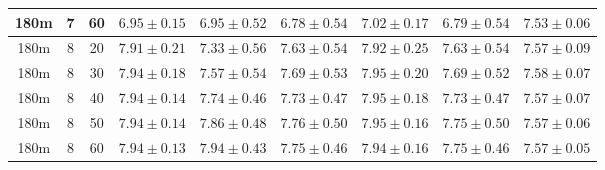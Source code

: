 \begin{table}
\begin{center}
\begin{tabular}{ccc|c|ccccc}
  180m &   7 &  60 & $6.95 \pm 0.15$ & $6.95 \pm 0.52$ & $6.78 \pm 0.54$ & $7.02 \pm 0.17$ & $6.79 \pm 0.54$ & $7.53 \pm 0.06$ \\ 
   \hline
180m &   8 &  20 & $7.91 \pm 0.21$ & $7.33 \pm 0.56$ & $7.63 \pm 0.54$ & $7.92 \pm 0.25$ & $7.63 \pm 0.54$ & $7.57 \pm 0.09$ \\ 
  180m &   8 &  30 & $7.94 \pm 0.18$ & $7.57 \pm 0.54$ & $7.69 \pm 0.53$ & $7.95 \pm 0.20$ & $7.69 \pm 0.52$ & $7.58 \pm 0.07$ \\ 
  180m &   8 &  40 & $7.94 \pm 0.14$ & $7.74 \pm 0.46$ & $7.73 \pm 0.47$ & $7.95 \pm 0.18$ & $7.73 \pm 0.47$ & $7.57 \pm 0.07$ \\ 
  180m &   8 &  50 & $7.94 \pm 0.14$ & $7.86 \pm 0.48$ & $7.76 \pm 0.50$ & $7.95 \pm 0.16$ & $7.75 \pm 0.50$ & $7.57 \pm 0.06$ \\ 
  180m &   8 &  60 & $7.94 \pm 0.13$ & $7.94 \pm 0.43$ & $7.75 \pm 0.46$ & $7.94 \pm 0.16$ & $7.75 \pm 0.46$ & $7.57 \pm 0.05$ \\ 
   \hline
\end{tabular}
\end{center}
\end{table}


